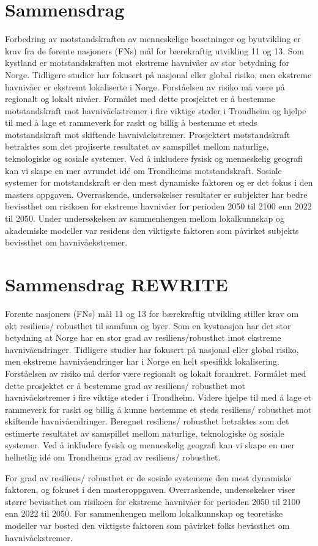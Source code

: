 \newpage

\section{Sammensdrag}
Forbedring av motstandskraften av menneskelige bosetninger og byutvikling er krav fra de forente nasjoners (FNs) mål for bærekraftig utvikling 11 og 13. Som kystland er motstandskraften mot ekstreme havnivåer av stor betydning for Norge. Tidligere studier har fokusert på nasjonal eller global risiko, men ekstreme havnivåer er ekstremt lokaliserte i Norge. Forståelsen av risiko må være på regionalt og lokalt nivåer. Formålet med dette prosjektet er å bestemme motstandskraft mot havnivåekstremer i fire viktige steder i Trondheim og hjelpe til med å lage et rammeverk for raskt og billig å bestemme et steds motstandskraft mot skiftende havnivåekstremer. Prosjektert motstandskraft betraktes som det projiserte resultatet av samspillet mellom naturlige, teknologiske og sosiale systemer. Ved å inkludere fysisk og menneskelig geografi kan vi skape en mer avrundet idé om Trondheims motstandskraft.
Sosiale systemer for motstandskraft er den mest dynamiske faktoren og er det fokus i den masters oppgaven. Overraskende, undersøkelser resultater er subjekter har bedre bevissthet om risikoen for ekstreme havnivåer for perioden 2050 til 2100 enn 2022 til 2050. Under undersøkelsen av sammenhengen mellom lokalkunnskap og akademiske modeller var residens den viktigste faktoren som påvirket subjekts bevissthet om havnivåekstremer.

\section{Sammensdrag REWRITE}
Forente nasjoners (FNs) mål 11 og 13 for bærekraftig utvikling stiller krav om økt resiliens/ robusthet til samfunn og byer. Som en kystnasjon har det stor betydning at Norge har en stor grad av resiliens/robusthet imot ekstreme havnivåendringer. Tidligere studier har fokusert på nasjonal eller global risiko, men ekstreme havnivåendringer har i Norge en helt spesifikk lokalisering. Forståelsen av risiko må derfor være regionalt og lokalt forankret. Formålet med dette prosjektet er å bestemme grad av resiliens/ robusthet mot havnivåekstremer i fire viktige steder i Trondheim. Videre hjelpe til med å lage et rammeverk for raskt og billig å kunne bestemme et steds resiliens/ robusthet mot skiftende havnivåendringer. Beregnet resiliens/ robusthet betraktes som det estimerte resultatet av samspillet mellom naturlige, teknologiske og sosiale systemer. Ved å inkludere fysisk og menneskelig geografi kan vi skape en mer helhetlig idé om Trondheims grad av resiliens/ robusthet. 

For grad av resiliens/ robusthet er de sosiale systemene den mest dynamiske faktoren, og fokuset i den masteroppgaven. Overraskende, undersøkelser viser større bevissthet om risikoen for ekstreme havnivåer for perioden 2050 til 2100 enn 2022 til 2050. For sammenhengen mellom lokalkunnskap og teoretiske modeller var bosted den viktigste faktoren som påvirket folks bevissthet om havnivåekstremer.